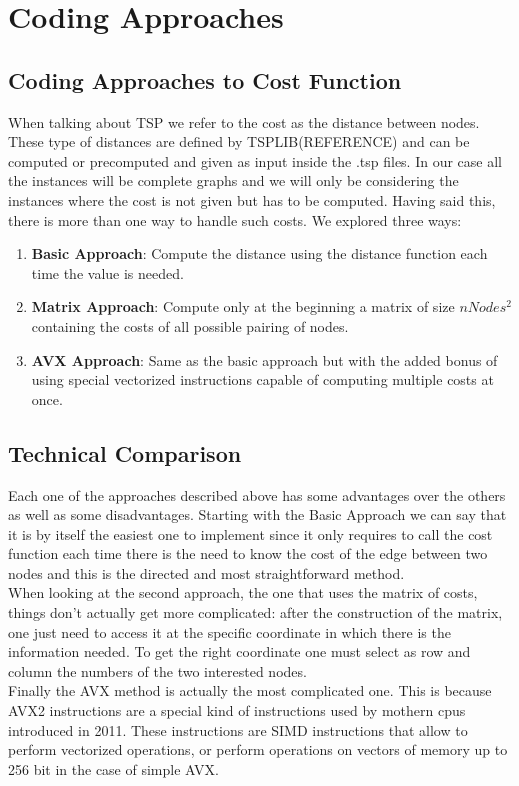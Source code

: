 \chapter{Coding Approaches}

\section{Coding Approaches to Cost Function}

When talking about TSP we refer to the cost as the distance between nodes. These type of distances are defined by TSPLIB(REFERENCE) and can be computed or precomputed and given as input inside the .tsp files. In our case all the instances will be complete graphs and we will only be considering the instances where the cost is not given but has to be computed. Having said this, there is more than one way to handle such costs. We explored three ways:

\begin{enumerate}
	\item \textbf{Basic Approach}: Compute the distance using the distance function each time the value is needed.
	\item \textbf{Matrix Approach}: Compute only at the beginning a matrix of size $nNodes^2$ containing the costs of all possible pairing of nodes.
	\item \textbf{AVX Approach}: Same as the basic approach but with the added bonus of using special vectorized instructions capable of computing multiple costs at once.
\end{enumerate}

\section{Technical Comparison}

Each one of the approaches described above has some advantages over the others as well as some disadvantages. Starting with the Basic Approach we can say that it is by itself the easiest one to implement since it only requires to call the cost function each time there is the need to know the cost of the edge between two nodes and this is the directed and most straightforward method. \\
When looking at the second approach, the one that uses the matrix of costs, things don't actually get more complicated: after the construction of the matrix, one just need to access it at the specific coordinate in which there is the information needed. To get the right coordinate one must select as row and column the numbers of the two interested nodes. \\
Finally the AVX method is actually the most complicated one. This is because AVX2 instructions are a special kind of instructions used by mothern cpus introduced in 2011\cite{avxWikipedia}. These instructions are SIMD instructions that allow to perform vectorized operations, or perform operations on vectors of memory up to 256 bit in the case of simple AVX\cite{avxWikipedia}.

